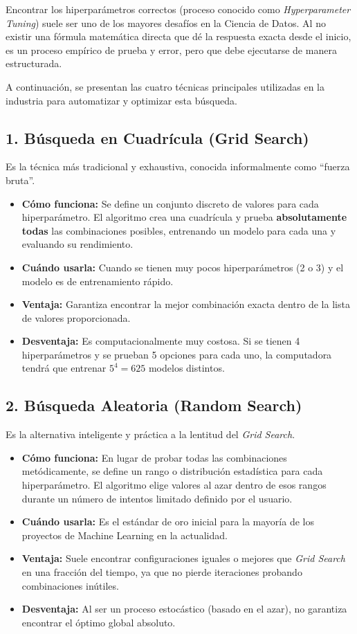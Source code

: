 Encontrar los hiperparámetros correctos (proceso conocido como \textit{Hyperparameter Tuning}) suele ser uno de los mayores desafíos en la Ciencia de Datos. Al no existir una fórmula matemática directa que dé la respuesta exacta desde el inicio, es un proceso empírico de prueba y error, pero que debe ejecutarse de manera estructurada.

A continuación, se presentan las cuatro técnicas principales utilizadas en la industria para automatizar y optimizar esta búsqueda.

\subsection{1. Búsqueda en Cuadrícula (Grid Search)}
Es la técnica más tradicional y exhaustiva, conocida informalmente como ``fuerza bruta''.

\begin{itemize}
    \item \textbf{Cómo funciona:} Se define un conjunto discreto de valores para cada hiperparámetro. El algoritmo crea una cuadrícula y prueba \textbf{absolutamente todas} las combinaciones posibles, entrenando un modelo para cada una y evaluando su rendimiento.
    \item \textbf{Cuándo usarla:} Cuando se tienen muy pocos hiperparámetros (2 o 3) y el modelo es de entrenamiento rápido.
    \item \textbf{Ventaja:} Garantiza encontrar la mejor combinación exacta dentro de la lista de valores proporcionada.
    \item \textbf{Desventaja:} Es computacionalmente muy costosa. Si se tienen 4 hiperparámetros y se prueban 5 opciones para cada uno, la computadora tendrá que entrenar $5^4 = 625$ modelos distintos.
\end{itemize}

\subsection{2. Búsqueda Aleatoria (Random Search)}
Es la alternativa inteligente y práctica a la lentitud del \textit{Grid Search}.

\begin{itemize}
    \item \textbf{Cómo funciona:} En lugar de probar todas las combinaciones metódicamente, se define un rango o distribución estadística para cada hiperparámetro. El algoritmo elige valores al azar dentro de esos rangos durante un número de intentos limitado definido por el usuario.
    \item \textbf{Cuándo usarla:} Es el estándar de oro inicial para la mayoría de los proyectos de Machine Learning en la actualidad.
    \item \textbf{Ventaja:} Suele encontrar configuraciones iguales o mejores que \textit{Grid Search} en una fracción del tiempo, ya que no pierde iteraciones probando combinaciones inútiles.
    \item \textbf{Desventaja:} Al ser un proceso estocástico (basado en el azar), no garantiza encontrar el óptimo global absoluto.
\end{itemize}

